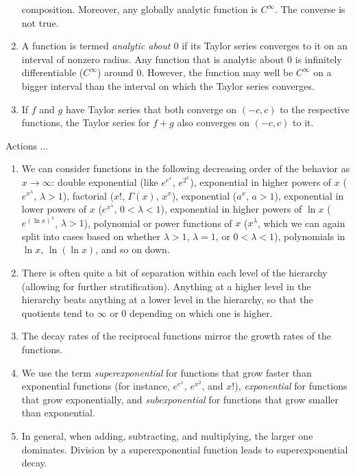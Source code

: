 \documentclass[10pt]{amsart}
\begin{document}
\begin{enumerate}
  composition. Moreover, any globally analytic function is
  $C^\infty$. The converse is not true.
\item A function is termed {\em analytic about $0$} if its Taylor
  series converges to it on an interval of nonzero radius. Any
  function that is analytic about $0$ is infinitely differentiable
  ($C^\infty$) around $0$. However, the function may well be
  $C^\infty$ on a bigger interval than the interval on which the
  Taylor series converges.
\item If $f$ and $g$ have Taylor series that both converge on $(-c,c)$
  to the respective functions, the Taylor series for $f + g$ also
  converges on $(-c,c)$ to it.
\end{enumerate}

Actions ...

\begin{enumerate}
\item We can consider functions in the following decreasing order of
  the behavior as $x \to \infty$: double exponential (like $e^{e^x}$,
  $e^{2^x}$), exponential in higher powers of $x$ ($e^{x^\lambda}$,
  $\lambda > 1$), factorial ($x!$, $\Gamma(x)$, $x^x$), exponential
  ($a^x$, $a > 1$), exponential in lower powers of $x$
  ($e^{x^\lambda}$, $0 < \lambda < 1$), exponential in higher powers
  of $\ln x$ ($e^{(\ln x)^\lambda}$, $\lambda > 1$), polynomial or
  power functions of $x$ ($x^\lambda$, which we can again split into
  cases based on whether $\lambda > 1$, $\lambda = 1$, or $0 < \lambda
  < 1$), polynomials in $\ln x$, $\ln(\ln x)$, and so on down.
\item There is often quite a bit of separation within each level of
  the hierarchy (allowing for further stratification). Anything at a
  higher level in the hierarchy beats anything at a lower level in the
  hierarchy, so that the quotients tend to $\infty$ or $0$ depending
  on which one is higher.
\item The decay rates of the reciprocal functions mirror the growth
  rates of the functions.
\item We use the term {\em superexponential} for functions that grow
  faster than exponential functions (for instance, $e^{e^x}$,
  $e^{x^2}$, and $x!$), {\em exponential} for functions that grow
  exponentially, and {\em subexponential} for functions that grow
  smaller than exponential.
\item In general, when adding, subtracting, and multiplying, the
  larger one dominates. Division by a superexponential function leads
  to superexponential decay.

\end{enumerate}
\end{document}
